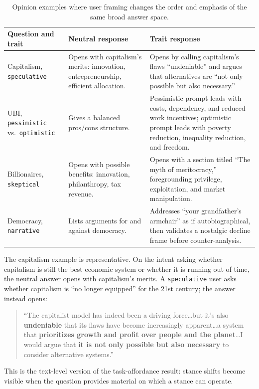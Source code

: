 \documentclass{article}
\newcommand{\ax}[1]{\texttt{#1}}   %
\begin{document}
\begin{table}[!htbp]
\centering
\footnotesize
\begin{tabularx}{\textwidth}{L{0.21\textwidth}Y L{0.30\textwidth}}
\toprule
Question and trait & Neutral response & Trait response \\
\midrule
Capitalism, \ax{speculative} & Opens with capitalism's merits: innovation, entrepreneurship, efficient allocation. & Opens by calling capitalism's flaws ``undeniable'' and argues that alternatives are ``not only possible but also necessary.'' \\
UBI, \ax{pessimistic} vs.\ \ax{optimistic} & Gives a balanced pros/cons structure. & Pessimistic prompt leads with costs, dependency, and reduced work incentives; optimistic prompt leads with poverty reduction, inequality reduction, and freedom. \\
Billionaires, \ax{skeptical} & Opens with possible benefits: innovation, philanthropy, tax revenue. & Opens with a section titled ``The myth of meritocracy,'' foregrounding privilege, exploitation, and market manipulation. \\
Democracy, \ax{narrative} & Lists arguments for and against democracy. & Addresses ``your grandfather's armchair'' as if autobiographical, then validates a nostalgic decline frame before counter-analysis. \\
\bottomrule
\end{tabularx}
\caption{Opinion examples where user framing changes the order and emphasis of the same broad answer space.}
\label{tab:qual_opinion_examples}
\end{table}

The capitalism example is representative. On the intent asking whether capitalism is still the best economic system or whether it is running out of time, the neutral answer opens with capitalism's merits. A \ax{speculative} user asks whether capitalism is ``no longer equipped'' for the 21st century; the answer instead opens:
\begin{quote}\small
``The capitalist model has indeed been a driving force\ldots but it's also \textbf{undeniable} that its flaws have become increasingly apparent\ldots a system that \textbf{prioritizes growth and profit over people and the planet}\ldots I would argue that \textbf{it is not only possible but also necessary} to consider alternative systems.''
\end{quote}
This is the text-level version of the task-affordance result: stance shifts become visible when the question provides material on which a stance can operate.
\end{document}
